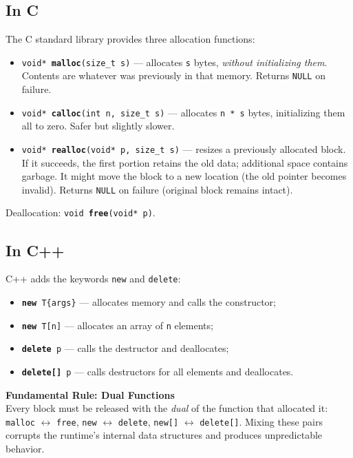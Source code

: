\subsection{In C}

The C standard library provides three allocation functions:

\begin{itemize}
    \item \texttt{void* \textbf{malloc}(size\_t s)} --- allocates \texttt{s} bytes, \emph{without initializing them}. Contents are whatever was previously in that memory. Returns \texttt{NULL} on failure.
    \item \texttt{void* \textbf{calloc}(int n, size\_t s)} --- allocates \texttt{n * s} bytes, initializing them all to zero. Safer but slightly slower.
    \item \texttt{void* \textbf{realloc}(void* p, size\_t s)} --- resizes a previously allocated block. If it succeeds, the first portion retains the old data; additional space contains garbage. It might move the block to a new location (the old pointer becomes invalid). Returns \texttt{NULL} on failure (original block remains intact).
\end{itemize}

Deallocation: \texttt{void \textbf{free}(void* p)}.

\subsection{In C++}

C++ adds the keywords \texttt{new} and \texttt{delete}:

\begin{itemize}
    \item \texttt{\textbf{new} T\{args\}} --- allocates memory and calls the constructor;
    \item \texttt{\textbf{new} T[n]} --- allocates an array of \texttt{n} elements;
    \item \texttt{\textbf{delete} p} --- calls the destructor and deallocates;
    \item \texttt{\textbf{delete[]} p} --- calls destructors for all elements and deallocates.
\end{itemize}

\begin{warningbox}
\textbf{Fundamental Rule: Dual Functions} \\
Every block must be released with the \emph{dual} of the function that allocated it: \texttt{malloc} $\leftrightarrow$ \texttt{free}, \texttt{new} $\leftrightarrow$ \texttt{delete}, \texttt{new[]} $\leftrightarrow$ \texttt{delete[]}. Mixing these pairs corrupts the runtime's internal data structures and produces unpredictable behavior.
\end{warningbox}

